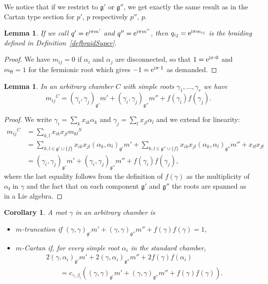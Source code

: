 \documentclass[10pt,a4paper]{amsart}
\numberwithin{equation}{section}
\newtheorem{cor}[teo]{Corollary}
\newtheorem{lem}[teo]{Lemma}
\newcommand{\f}{\mathsf{f}}
\begin{document}
We notice that if we restrict to $\mathfrak{g'}$ or $\mathfrak{g''}$, we get exactly the same result as in the Cartan type section for $p'$, $p$ respectively $p''$, $p$.
\begin{lem}
If we call $q'={\rm e}^{{\rm i} \pi m'}$ and $q''={\rm e}^{{\rm i} \pi m''}$, then $q_{ij}={\rm e}^{{\rm i} \pi m_{ij}}$ is the braiding defined in Definition~{\rm \ref{defbraidSuper}}.
\end{lem}
\begin{proof}
We have $m_{ij}=0$ if $\alpha_i$ and $\alpha_j$ are disconnected, so that $1={\rm e}^{{\rm i} \pi \cdot 0}$ and $m_{\f\f}=1$ for the fermionic root which gives $-1 = {\rm e}^{{\rm i} \pi \cdot 1}$ as demanded.
\end{proof}

\begin{lem}In an arbitrary chamber $C$ with simple roots ${\gamma_1, \dots, \gamma_{r}}$ we have \[{m_{ij}}^C= (\gamma_i, \gamma_j)_{\mathfrak{g'}}m' + (\gamma_i, \gamma_j)_{\mathfrak{g''}}m'' +f(\gamma_i)f(\gamma_j).\]
\end{lem}
\begin{proof}
We write $\gamma_i = \sum_{k} x_{ik} \alpha_k$ and $\gamma_j = \sum_{l} x_{jl} \alpha_l$ and we extend for linearity:
\begin{align*}
{m_{ij}}^C &=  \sum_{k,l} x_{ik} x_{jl} {m_{kl}}^S \\
&= \sum_{k,l \in \mathfrak{g'} \cup \lbrace f \rbrace} x_{ik} x_{jl} (\alpha_k, \alpha_l)_{\mathfrak{g'}}m' + \sum_{k,l \in \mathfrak{g''} \cup \lbrace f \rbrace} x_{ik} x_{jl} (\alpha_k, \alpha_l)_{\mathfrak{g''}}m'' + x_{i\f} x_{j\f}   \\
&=  (\gamma_i, \gamma_j)_{\mathfrak{g'}}m' + (\gamma_i, \gamma_j)_{\mathfrak{g''}}m''+f(\gamma_i) f(\gamma_j),
\end{align*}
where the last equality follows from the definition of $f(\gamma)$ as the multiplicity of $\alpha_\f$ in $\gamma$ and the fact that on each component $\mathfrak{g'}$ and $\mathfrak{g''}$ the roots are spanned as in a Lie algebra.
\end{proof}

\begin{cor}\label{Mcondotherchamb}A root $\gamma$ in an arbitrary chamber is
\begin{itemize}\itemsep=0pt
	\item[--] $m$-truncation if $(\gamma,\gamma)_\mathfrak{g'} m' + (\gamma,\gamma)_\mathfrak{g''} m'' + f(\gamma)f(\gamma) =1$,
	\item[--] $m$-Cartan if, for every simple root $\alpha_i$ in the standard chamber,
	\begin{gather*}
	2(\gamma,\alpha_i)_\mathfrak{g'} m' + 2(\gamma,\alpha_i)_\mathfrak{g''} m'' + 2f(\gamma)f(\alpha_i) \\
\qquad {} = c_{\gamma,\beta_i}((\gamma,\gamma)_\mathfrak{g'} m' + (\gamma,\gamma)_\mathfrak{g''} m'' + f(\gamma)f(\gamma)).
	\end{gather*}
\end{itemize}
\end{cor}
\end{document}
